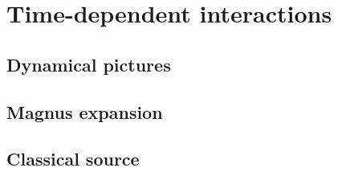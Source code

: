 \section{Time-dependent interactions}

\subsection{Dynamical pictures}

\subsection{Magnus expansion}

\subsection{Classical source}